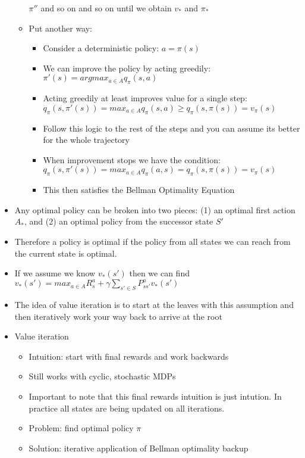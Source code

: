 \documentclass[12pt]{article}
\begin{document}
\begin{itemize}
\begin{itemize}
      $\pi''$ and so on and so on until we obtain $v_*$ and $\pi_*$
      \item Put another way:
      \begin{itemize}
        \item Consider a deterministic policy: $a = \pi(s)$
        \item We can improve the policy by acting greedily: $\pi'(s) = argmax_{a \in A}q_\pi(s, a)$
        \item Acting greedily at least improves value for a single step: 
        $q_\pi(s, \pi'(s)) = max_{a \in A}q_\pi(s,a) \ge q_\pi(s, \pi(s)) = v_\pi(s)$
        \item Follow this logic to the rest of the steps and you can assume its better for the whole trajectory
        \item When improvement stops we have the condition: \\
        $q_\pi(s,\pi'(s)) = max_{a \in A}q_\pi(a, s) = q_\pi(s, \pi(s)) = v_\pi(s)$
        \item This then satisfies the Bellman Optimality Equation
      \end{itemize}
    \end{itemize}
    \item Any optimal policy can be broken into two pieces: (1) an optimal first action $A_*$, and (2)
    an optimal policy from the successor state $S'$
    \item Therefore a policy is optimal if the policy from all states we can reach from the current state is optimal.
    \item If we assume we know $v_*(s')$ then we can find $v_*(s') = max_{a \in A}R_s^a + \gamma \sum_{s' \in S}P_{ss'}^a v_*(s')$
    \item The idea of value iteration is to start at the leaves with this assumption and then
    iteratively work your way back to arrive at the root
    \item Value iteration
    \begin{itemize}
      \item Intuition: start with final rewards and work backwards
      \item Still works with cyclic, stochastic MDPs 
      \item Important to note that this final rewards intuition is just intution.
      In practice all states are being updated on all iterations.
      \item Problem: find optimal policy $\pi$
      \item Solution: iterative application of Bellman optimality backup

\end{itemize}
\end{itemize}
\end{document}
